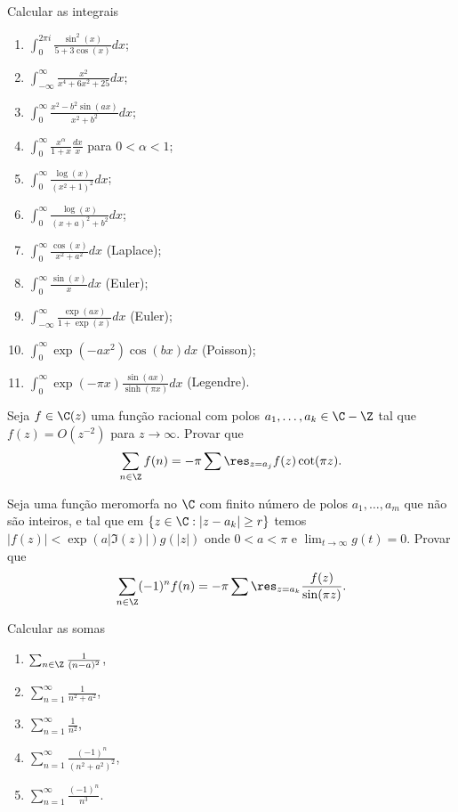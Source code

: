 \begin{problema}
Calcular as integrais
\begin{enumerate}
\item $\int_0^{2\pi i} \frac{\sin^2(x)}{5+3\cos(x)} dx$;
\item $\int_{-\infty}^\infty \frac{x^2}{x^4 + 6 x^2 + 25} dx$;
\item $\int_{0}^{\infty} \frac{x^2 - b^2 \sin(ax)}{x^2 + b^2} dx$;
\item $\int_{0}^{\infty} \frac{x^\alpha}{1+x}  \frac{dx}{x}$ para $0<\alpha<1$;
\item $\int_{0}^{\infty} \frac{\log(x)}{(x^2+1)^2} dx$;
\item $\int_{0}^{\infty} \frac{\log(x)}{(x+a)^2+b^2} dx$;
\item $\int_{0}^{\infty} \frac{\cos(x)}{x^2 + a^2}  dx$ (Laplace);
\item $\int_{0}^{\infty} \frac{\sin(x)}{x}  dx$ (Euler);
\item $\int_{-\infty}^{\infty} \frac{\exp(ax)}{1+\exp(x)} dx$ (Euler);
\item $\int_{0}^{\infty} \exp(-a x^2) \cos(bx)  dx$ (Poisson);
\item $\int_{0}^{\infty} \exp(-\pi x) \frac{\sin(ax)}{\sinh(\pi x)}  dx$ (Legendre).
\end{enumerate}
\end{problema}

\begin{problema}
Seja $f \in \C(z)$ uma função racional com polos $a_1,\dots,a_k \in \C -\Z$ tal
que $f(z) = O(z^{-2})$ para $z\to\infty$. Provar que
\[ \sum_{n\in\Z} f(n) = -\pi \sum \res_{z=a_j} f(z) \cot(\pi z) . \]
\end{problema}

\begin{problema}
Seja uma função meromorfa no $\C$ com finito número de polos $a_1,\dots,a_m$
que não são inteiros, e tal que em $\{z\in\C : |z-a_k|\geq r\}$ temos
$|f(z)| < \exp(a|\Im(z)|) g(|z|)$ onde $0<a<\pi$ e $\lim_{t\to\infty} g(t) = 0$.
Provar que 
\[ \sum_{n\in\Z} (-1)^n f(n) =  -\pi \sum \res_{z=a_k} \frac{f(z)}{\sin(\pi z)} . \]
\end{problema}


\begin{problema}
Calcular as somas
\begin{enumerate}
\item $\sum_{n\in\Z} \frac{1}{(n-a)^2}$,
\item $\sum_{n=1}^\infty \frac{1}{n^2 + a^2}$,
\item $\sum_{n=1}^\infty \frac{1}{n^2}$,
\item $\sum_{n=1}^\infty \frac{(-1)^n}{(n^2+a^2)^2}$,
\item $\sum_{n=1}^\infty \frac{(-1)^n}{n^3}$.
\end{enumerate}
\end{problema}

